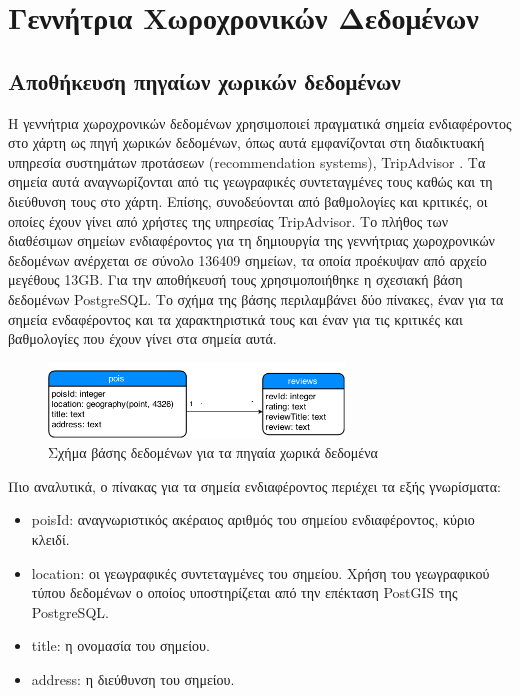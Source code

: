 \chapter{Γεννήτρια Χωροχρονικών Δεδομένων}

\section{Αποθήκευση πηγαίων χωρικών δεδομένων}

Η γεννήτρια χωροχρονικών δεδομένων χρησιμοποιεί πραγματικά σημεία ενδιαφέροντος στο χάρτη ως πηγή χωρικών δεδομένων, όπως αυτά εμφανίζονται στη διαδικτυακή υπηρεσία 
συστημάτων προτάσεων (recommendation systems), TripAdvisor \cite{7}. Τα σημεία αυτά αναγνωρίζονται από τις γεωγραφικές συντεταγμένες τους καθώς και τη 
διεύθυνση τους στο χάρτη. Επίσης, συνοδεύονται από βαθμολογίες και κριτικές, οι οποίες έχουν γίνει από χρήστες της υπηρεσίας TripAdvisor. Το πλήθος των  
διαθέσιμων σημείων ενδιαφέροντος για τη δημιουργία της γεννήτριας χωροχρονικών δεδομένων ανέρχεται σε σύνολο 136409 σημείων, τα οποία προέκυψαν από αρχείο 
μεγέθους 13GB. Για την αποθήκευσή τους χρησιμοποιήθηκε 
η σχεσιακή βάση δεδομένων PostgreSQL. Το σχήμα της βάσης περιλαμβάνει δύο πίνακες, έναν για τα σημεία ενδαφέροντος και τα χαρακτηριστικά τους και έναν για τις κριτικές και 
βαθμολογίες που έχουν γίνει στα σημεία αυτά. 

\begin{figure}[H]
  \centering
  \includegraphics[width=0.7\textwidth]{figures/schema.png}
  \caption{Σχήμα βάσης δεδομένων για τα πηγαία χωρικά δεδομένα}
\end{figure}

Πιο αναλυτικά, ο πίνακας για τα σημεία ενδιαφέροντος περιέχει τα εξής γνωρίσματα:

\begin{itemize}
 \item poisId: αναγνωριστικός ακέραιος αριθμός του σημείου ενδιαφέροντος, κύριο κλειδί.
 \item location: οι γεωγραφικές συντεταγμένες του σημείου. Χρήση του γεωγραφικού τύπου δεδομένων ο οποίος υποστηρίζεται από την επέκταση PostGIS της PostgreSQL.
 \item title: η ονομασία του σημείου.
 \item address: η διεύθυνση του σημείου.
\end{itemize}

